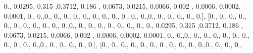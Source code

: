 \documentclass[
]{book}
\newenvironment{Shaded}{\begin{snugshade}}{\end{snugshade}}
\newcommand{\FloatTok}[1]{\textcolor[rgb]{0.00,0.00,0.81}{#1}}
\newcommand{\NormalTok}[1]{#1}
\begin{document}
\begin{Shaded}
\begin{Highlighting}[]
\FloatTok{0.}\NormalTok{, }\FloatTok{0.0295}\NormalTok{, }\FloatTok{0.315}\NormalTok{ ,}\FloatTok{0.3712}\NormalTok{, }\FloatTok{0.186}\NormalTok{ , }\FloatTok{0.0673}\NormalTok{, }\FloatTok{0.0215}\NormalTok{, }\FloatTok{0.0066}\NormalTok{, }\FloatTok{0.002}\NormalTok{ , }\FloatTok{0.0006}\NormalTok{,}
\FloatTok{0.0002}\NormalTok{, }\FloatTok{0.0001}\NormalTok{, }\FloatTok{0.}\NormalTok{, }\FloatTok{0.}\NormalTok{,}\FloatTok{0.}\NormalTok{, }\FloatTok{0.}\NormalTok{, }\FloatTok{0.}\NormalTok{, }\FloatTok{0.}\NormalTok{, }\FloatTok{0.}\NormalTok{, }\FloatTok{0.}\NormalTok{, }\FloatTok{0.}\NormalTok{, }\FloatTok{0.}\NormalTok{, }\FloatTok{0.}\NormalTok{, }\FloatTok{0.}\NormalTok{, }\FloatTok{0.}\NormalTok{,}\FloatTok{0.}\NormalTok{, }\FloatTok{0.}\NormalTok{, }\FloatTok{0.}\NormalTok{,}
\FloatTok{0.}\NormalTok{, }\FloatTok{0.}\NormalTok{, }\FloatTok{0.}\NormalTok{], [}\FloatTok{0.}\NormalTok{, }\FloatTok{0.}\NormalTok{, }\FloatTok{0.}\NormalTok{, }\FloatTok{0.}\NormalTok{, }\FloatTok{0.}\NormalTok{, }\FloatTok{0.}\NormalTok{, }\FloatTok{0.}\NormalTok{, }\FloatTok{0.}\NormalTok{, }\FloatTok{0.}\NormalTok{, }\FloatTok{0.}\NormalTok{, }\FloatTok{0.}\NormalTok{,}\FloatTok{0.}\NormalTok{, }\FloatTok{0.}\NormalTok{, }\FloatTok{0.}\NormalTok{, }\FloatTok{0.}\NormalTok{, }\FloatTok{0.}\NormalTok{, }\FloatTok{0.}\NormalTok{,}
\FloatTok{0.}\NormalTok{, }\FloatTok{0.}\NormalTok{, }\FloatTok{0.}\NormalTok{, }\FloatTok{0.0295}\NormalTok{, }\FloatTok{0.315}\NormalTok{ ,}\FloatTok{0.3712}\NormalTok{, }\FloatTok{0.186}\NormalTok{ , }\FloatTok{0.0673}\NormalTok{, }\FloatTok{0.0215}\NormalTok{, }\FloatTok{0.0066}\NormalTok{, }\FloatTok{0.002}\NormalTok{ ,}
\FloatTok{0.0006}\NormalTok{, }\FloatTok{0.0002}\NormalTok{, }\FloatTok{0.0001}\NormalTok{, }\FloatTok{0.}\NormalTok{, }\FloatTok{0.}\NormalTok{,}\FloatTok{0.}\NormalTok{, }\FloatTok{0.}\NormalTok{, }\FloatTok{0.}\NormalTok{, }\FloatTok{0.}\NormalTok{, }\FloatTok{0.}\NormalTok{, }\FloatTok{0.}\NormalTok{, }\FloatTok{0.}\NormalTok{, }\FloatTok{0.}\NormalTok{, }\FloatTok{0.}\NormalTok{, }\FloatTok{0.}\NormalTok{, }\FloatTok{0.}\NormalTok{,}\FloatTok{0.}\NormalTok{,}
\FloatTok{0.}\NormalTok{, }\FloatTok{0.}\NormalTok{, }\FloatTok{0.}\NormalTok{, }\FloatTok{0.}\NormalTok{, }\FloatTok{0.}\NormalTok{], [}\FloatTok{0.}\NormalTok{, }\FloatTok{0.}\NormalTok{, }\FloatTok{0.}\NormalTok{, }\FloatTok{0.}\NormalTok{, }\FloatTok{0.}\NormalTok{, }\FloatTok{0.}\NormalTok{, }\FloatTok{0.}\NormalTok{, }\FloatTok{0.}\NormalTok{, }\FloatTok{0.}\NormalTok{, }\FloatTok{0.}\NormalTok{, }\FloatTok{0.}\NormalTok{,}\FloatTok{0.}\NormalTok{, }\FloatTok{0.}\NormalTok{, }\FloatTok{0.}\NormalTok{, }\FloatTok{0.}\NormalTok{,}

\end{Highlighting}
\end{Shaded}
\end{document}
